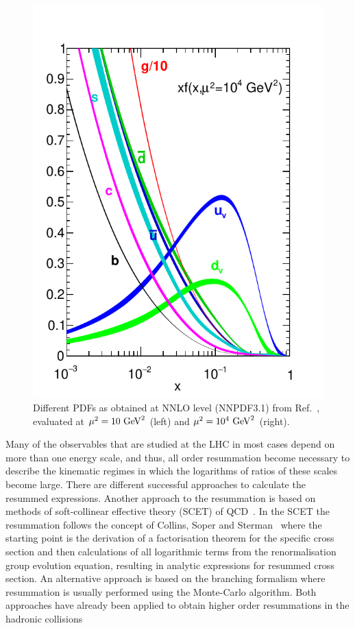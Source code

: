 \begin{figure}[t]
\begin{center}
  \includegraphics[scale=0.65]{Strong-Interaction/nnpdf31nnlo-1e4.pdf}
  \caption{\small Different PDFs as obtained  at NNLO level (NNPDF3.1) from Ref.~\cite{Ball:2017nwa}, evaluated
    at $\mu^2=10~{\rm GeV}^2$ (left) and $\mu^2=10^4~{\rm GeV}^2$ (right).
    \label{fig.pdf}
  }
\end{center}
\end{figure}
Many of the observables that are
  studied at the LHC in most cases  depend on more than one energy scale, and thus, all order resummation   become necessary to describe the kinematic regimes in which the logarithms of ratios of these scales become large.
There are different successful approaches to calculate the resummed expressions. Another approach to the resummation is based on methods of soft-collinear effective theory (SCET) of QCD~\cite{Bauer:2000ew,Bauer:2000yr,Bauer:2001ct,Bauer:2001yt,Bauer:2008dt,Bauer:2008jx}.
In the SCET the resummation follows the concept of Collins, Soper and Sterman~\cite{Collins:1984kg} where the starting point is  the derivation of a factorisation theorem for the specific cross section and then  calculations of all logarithmic terms from  the renormalisation group evolution equation, resulting in analytic expressions for resummed cross section.  An alternative approach is based on the branching formalism\cite{Catani:1990rr,Catani:1991kz} where resummation is usually performed using the Monte-Carlo algorithm.  Both approaches have already been applied to obtain higher order resummations in the hadronic collisions
